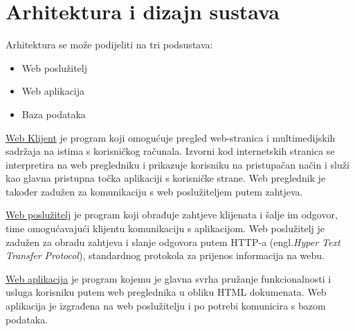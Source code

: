 \chapter{Arhitektura i dizajn sustava}
	Arhitektura se može podijeliti na tri podsustava:
	\begin{itemize}
		\item Web poslužitelj
		\item Web aplikacija
		\item Baza podataka
	\end{itemize}

	\underline{Web Klijent} je program koji omogućuje pregled web-stranica i multimedijskih sadržaja na istima s korisničkog računala. Izvorni kod internetskih stranica se interpretira na web pregledniku i prikazuje korisniku na pristupačan način i služi kao glavna pristupna točka aplikaciji s korisničke strane. Web preglednik je također zadužen za komunikaciju s web poslužiteljem putem zahtjeva.
	
	\underline{Web poslužitelj} je program koji obrađuje zahtjeve klijenata i šalje im odgovor, time omogućavajući klijentu komunikaciju s aplikacijom. Web poslužitelj je zadužen za obradu zahtjeva i slanje odgovora putem HTTP-a (engl.\textit{Hyper Text Transfer Protocol}), standardnog protokola za prijenos informacija na webu.
	
	\underline{Web aplikacija} je program kojemu je glavna svrha pružanje funkcionalnosti i usluga korisniku putem web preglednika u obliku HTML dokumenata. Web aplikacija je izgrađena na web poslužitelju i po potrebi komunicira s bazom podataka.
	
